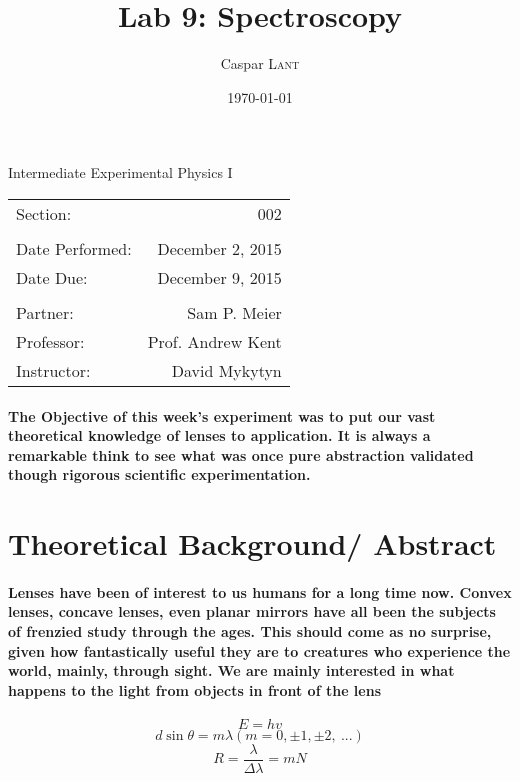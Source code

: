 \documentclass{amsart}
\title{Lab 9: Spectroscopy}
\author{Caspar \textsc{Lant}} %
\date{\today} %
\begin{document}
\bigskip

\maketitle %
\begin{center}

Intermediate Experimental Physics I\\
\vspace{1.5cm}

\begin{tabular}{l r}

Section: & 002\\
\\
Date Performed: & December 2, 2015 \\ %
Date Due: & December 9, 2015\\
\\
Partner: & Sam P. Meier \\ %
Professor: & Prof. Andrew Kent\\
Instructor: & David Mykytyn %
\end{tabular}
\end{center}
\vspace{50mm}
\pagebreak

\paragraph{\textbf{The Objective} of this week's experiment was to put our vast theoretical knowledge of lenses to application. It is always a remarkable think to see what was once pure abstraction validated though rigorous scientific experimentation. }

\section{Theoretical Background/ Abstract}
\paragraph{Lenses have been of interest to us humans for a long time now. Convex lenses, concave lenses, even planar mirrors have all been the subjects of frenzied study through the ages. This should come as no surprise, given how fantastically useful they are to creatures who experience the world, mainly, through sight. We are mainly interested in what happens to the light from objects in front of the lens}
\begin{equation}
E = hv
\end{equation}
\begin{equation}
d\sin\theta = m\lambda (m = 0, \pm1, \pm2, \ ...)
\end{equation}
\begin{equation}
R = \dfrac{\lambda}{\Delta\lambda} = mN
\end{equation}
\end{document}
